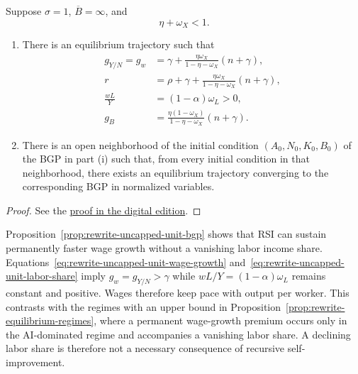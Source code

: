 \begin{proposition}
\label{prop:rewrite-uncapped-unit-bgp}
\label{prop:rewrite-uncapped-unit-local}
Suppose $\sigma=1$, $\overline B=\infty$, and
\begin{equation}
 \eta+\omega_X<1.
 \label{eq:rewrite-uncapped-unit-sufficient}
\end{equation}
\begin{enumerate}[label=(\roman*),leftmargin=*]
\item There is an equilibrium trajectory such that
\begin{align}
 g_{Y/N}=g_w& =\gamma+\frac{\eta\omega_X}{1-\eta-\omega_X}(n+\gamma),
 \label{eq:rewrite-uncapped-unit-wage-growth}\\
 r&=\rho+\gamma+\frac{\eta\omega_X}{1-\eta-\omega_X}(n+\gamma),
 \label{eq:rewrite-uncapped-unit-return}\\
 \frac{wL}{Y}&=(1-\alpha)\omega_L>0,
 \label{eq:rewrite-uncapped-unit-labor-share}\\
 g_B&=\frac{\eta(1-\omega_X)}{1-\eta-\omega_X}(n+\gamma).
 \label{eq:rewrite-uncapped-unit-efficiency-growth}
\end{align}
\item There is an open neighborhood of the initial condition
$(A_0,N_0,K_0,B_0)$ of the BGP in part (i) such that, from every initial
condition in that neighborhood, there exists an equilibrium trajectory
converging to the corresponding BGP in normalized variables.
\end{enumerate}
\end{proposition}
\begin{proof}
See the \href{https://oliverpardo1979.github.io/ai-growth-and-labor/#proof:rewrite-uncapped-unit-bgp}
{proof in the digital edition}.
\end{proof}

Proposition~\ref{prop:rewrite-uncapped-unit-bgp} shows that RSI can sustain
permanently faster wage growth without a vanishing labor income share.
Equations~\eqref{eq:rewrite-uncapped-unit-wage-growth}
and~\eqref{eq:rewrite-uncapped-unit-labor-share} imply
$g_w=g_{Y/N}>\gamma$ while $wL/Y=(1-\alpha)\omega_L$ remains
constant and positive. Wages therefore keep pace with output per
worker. This contrasts with the regimes with an upper bound in
Proposition~\ref{prop:rewrite-equilibrium-regimes}, where a permanent
wage-growth premium occurs only in the AI-dominated regime and accompanies
a vanishing labor share. A declining labor share is therefore not a
necessary consequence of recursive self-improvement.

